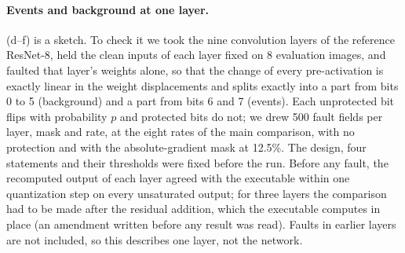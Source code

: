 \paragraph{Events and background at one layer.} (d--f) is a sketch. To check it we took the nine convolution layers of the reference ResNet-8, held the clean inputs of each layer fixed on 8 evaluation images, and faulted that layer's weights alone, so that the change of every pre-activation is exactly linear in the weight displacements and splits exactly into a part from bits 0 to 5 (background) and a part from bits 6 and 7 (events). Each unprotected bit flips with probability $p$ and protected bits do not; we drew 500 fault fields per layer, mask and rate, at the eight rates of the main comparison, with no protection and with the absolute-gradient mask at 12.5\%. The design, four statements and their thresholds were fixed before the run. Before any fault, the recomputed output of each layer agreed with the executable within one quantization step on every unsaturated output; for three layers the comparison had to be made after the residual addition, which the executable computes in place (an amendment written before any result was read). Faults in earlier layers are not included, so this describes one layer, not the network.


